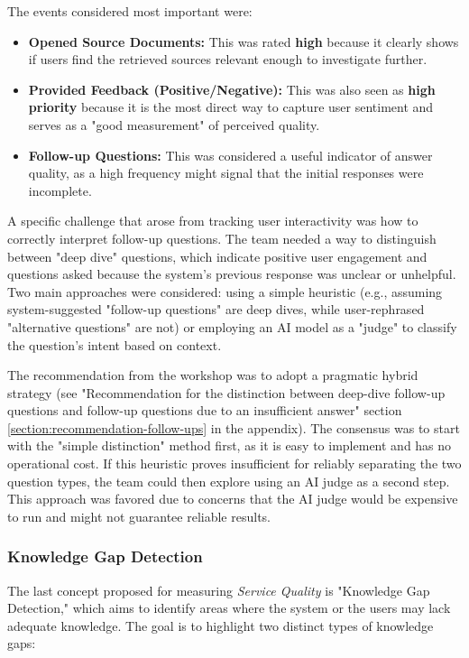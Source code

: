 \documentclass[
	english,
	ruledheaders=section,%
	class=report,%
	thesis={type=bachelor},%
	accentcolor=1b,%
	custommargins=true,%
	marginpar=false,%
	parskip=half-,%
	fontsize=11pt,%
	DIV=14,
]{tudapub}
\begin{document}
The events considered most important were:
\begin{itemize}
    \item \textbf{Opened Source Documents:} This was rated \textbf{high} because it clearly shows if users find the retrieved sources relevant enough to investigate further.
    \item \textbf{Provided Feedback (Positive/Negative):} This was also seen as \textbf{high priority} because it is the most direct way to capture user sentiment and serves as a "good measurement" of perceived quality.
    \item \textbf{Follow-up Questions:} This was considered a useful indicator of answer quality, as a high frequency might signal that the initial responses were incomplete.
\end{itemize}

A specific challenge that arose from tracking user interactivity was how to correctly interpret follow-up questions. The team needed a way to distinguish between "deep dive" questions, which indicate positive user engagement and questions asked because the system's previous response was unclear or unhelpful. Two main approaches were considered: using a simple heuristic (e.g., assuming system-suggested "follow-up questions" are deep dives, while user-rephrased "alternative questions" are not) or employing an AI model as a "judge" to classify the question's intent based on context.

The recommendation from the workshop was to adopt a pragmatic hybrid strategy (see "Recommendation for the distinction between deep-dive follow-up questions and follow-up questions due to an insufficient answer" section \ref{section:recommendation-follow-ups} in the appendix). The consensus was to start with the "simple distinction" method first, as it is easy to implement and has no operational cost. If this heuristic proves insufficient for reliably separating the two question types, the team could then explore using an AI judge as a second step. This approach was favored due to concerns that the AI judge would be expensive to run and might not guarantee reliable results.
\subsubsection{Knowledge Gap Detection}
The last concept proposed for measuring \textit{Service Quality} \parencite[p.~18]{DeloneMcLean2003ISSuccessTenYearUpdate} is "Knowledge Gap Detection," which aims to identify areas where the system or the users may lack adequate knowledge. The goal is to highlight two distinct types of knowledge gaps:
\end{document}
